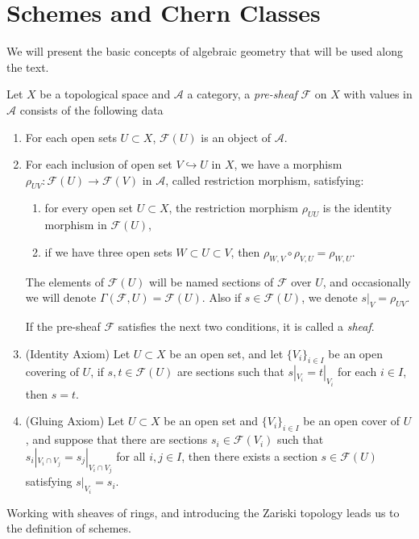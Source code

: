 \documentclass[
	oldfontcommands,
	sumario=abnt-6027-2012,
	12pt,			%
	openright,		%
	oneside,		%
	a4paper,		%
	english,		%
	brazil			%
	]{imecc-unicamp}
\begin{document}
\section{Schemes and Chern Classes}
We will present the basic concepts of algebraic geometry that will be used along the text.
\begin{definition}
	Let $X$ be a topological space and $\mathcal A$ a category, a \textit{pre-sheaf} $\mathcal F$ on $X$ with values in $\mathcal A$ consists of the following data
	\begin{enumerate}
		\item For each open sets $U\subset X$, $\mathcal F(U)$ is an object of $\mathcal A$.
		\item For each inclusion of open set $V\hookrightarrow U$ in $X$, we have a morphism $\rho_{UV}:\mathcal F(U)\rightarrow \mathcal F(V)$ in $\mathcal A$, called restriction morphism, satisfying:
		\begin{enumerate}
			\item for every open set $U\subset X$, the restriction morphism $\rho_{UU}$ is the identity morphism in $\mathcal F(U)$,
			\item if we have three open sets $W\subset U\subset V$, then $
			\rho_{W,V}\circ\rho_{V,U}=\rho_{W,U}.
			$
		\end{enumerate}
		The elements of $\mathcal F(U)$ will be named sections of $\mathcal F$ over $U$, and occasionally we will denote $\Gamma(\mathcal F,U)=\mathcal F(U)$. Also if $s\in \mathcal F(U)$, we denote $s|_V=\rho_{UV}$.
		
		If the pre-sheaf $\mathcal F$ satisfies the next two conditions, it is called a \textit{sheaf}.
		\item (Identity Axiom) Let $U\subset X$ be an open set, and let $\{V_i\}_{i\in I}$ be an open covering of $U$, if $s,t\in \mathcal F(U)$ are sections such that $s|_{V_i}=t|_{V_i}$ for each $i\in I$, then $s=t$.  
		\item (Gluing Axiom) Let $U\subset X$ be an open set and $\{V_i\}_{i\in I}$ be an open cover of $U$, and suppose that there are sections $s_i\in\mathcal F(V_i)$ such that $s_i|_{V_i\cap V_j}=s_j|_{V_i\cap V_j}$ for all $i,j\in I$, then there exists a section $s\in\mathcal F(U)$ satisfying $s|_{V_i}=s_i$. 
	\end{enumerate}
\end{definition}

Working with sheaves of rings, and introducing the Zariski topology leads us to the definition of schemes.
\end{document}
